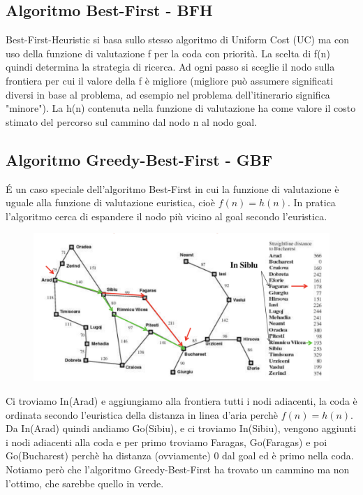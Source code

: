 \documentclass{article}
\begin{document}
\subsection{Algoritmo Best-First - BFH}
Best-First-Heuristic si basa sullo stesso algoritmo di Uniform Cost (UC) ma con uso della funzione di valutazione f per la coda con priorità. La scelta di f(n) quindi determina la strategia di ricerca. Ad ogni passo si sceglie il nodo sulla frontiera per cui il valore della f è migliore (migliore può assumere significati diversi in base al problema, ad esempio nel problema dell'itinerario significa "minore"). La h(n) contenuta nella funzione di valutazione ha come valore il costo stimato del percorso sul cammino dal nodo n al nodo goal.
\clearpage

\subsection{Algoritmo Greedy-Best-First - GBF}
É un caso speciale dell'algoritmo Best-First in cui la funzione di valutazione è uguale alla funzione di valutazione euristica, cioè $f(n)=h(n)$. In pratica l'algoritmo cerca di espandere il nodo più vicino al goal secondo l'euristica.
\begin{figure}[H]
    \centering
    \includegraphics[scale=0.6]{Images/GBF.png}
\end{figure}
Ci troviamo In(Arad) e aggiungiamo alla frontiera tutti i nodi adiacenti, la coda è ordinata secondo l'euristica della distanza in linea d'aria perchè $f(n)=h(n)$. Da In(Arad) quindi andiamo Go(Sibiu), e ci troviamo In(Sibiu), vengono aggiunti i nodi adiacenti alla coda e per primo troviamo Faragas, Go(Faragas) e poi Go(Bucharest) perchè ha distanza (ovviamente) 0 dal goal ed è primo nella coda. Notiamo però che l'algoritmo Greedy-Best-First ha trovato un cammino ma non l'ottimo, che sarebbe quello in verde.
\end{document}
